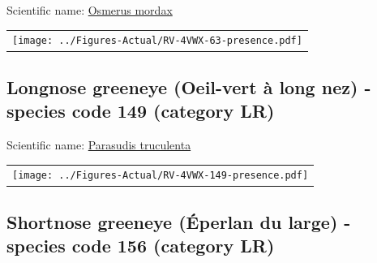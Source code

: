 \documentclass[12pt]{article}\usepackage[]{graphicx}\usepackage[]{color}
\begin{document}

Scientific name: \href{http://www.marinespecies.org/aphia.php?p=taxdetails\&id=126737}{Osmerus mordax} \newline
\begin{minipage}{1.0\textwidth}
 \begin{tabular}{c}
\texttt{[image: ../Figures-Actual/RV-4VWX-63-presence.pdf]} \\ 
\end{tabular} 
\end{minipage}
\clearpage

\renewcommand\thefigure{\thesubsection\Alph{figure}}

\setcounter{figure}{0}

\hypertarget{sec:149}{%
\subsection{Longnose greeneye (Oeil-vert à long nez) - species code 149 (category LR)}\label{sec:149}}

  


Scientific name: \href{http://www.marinespecies.org/aphia.php?p=taxdetails\&id=158868}{Parasudis truculenta} \newline
\begin{minipage}{1.0\textwidth}
 \begin{tabular}{c}
\texttt{[image: ../Figures-Actual/RV-4VWX-149-presence.pdf]} \\ 
\end{tabular} 
\end{minipage}
\clearpage

\renewcommand\thefigure{\thesubsection\Alph{figure}}

\setcounter{figure}{0}

\hypertarget{sec:156}{%
\subsection{Shortnose greeneye (Éperlan du large) - species code 156 (category LR)}\label{sec:156}}

  
\end{document}
